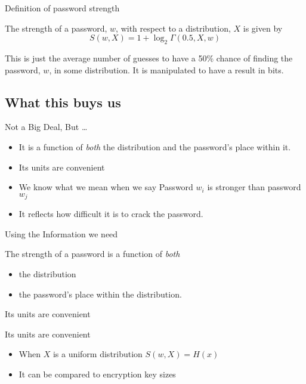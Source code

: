 \documentclass[xcolor={dvipsnames,table}]{beamer}
\newcommand\G{\ensuremath{\Gamma}}
\begin{document}
\begin{frame}{Definition of password strength}
\begin{definition} \label{def:S}
The strength of a password, $w$, with respect to a distribution, $X$ is given by
$$
S(w, X) =  1 + \log_2\G(0.5, X, w)
$$
\end{definition}
This is just the average number of guesses to have a 50\% chance of finding the password, $w$, in some distribution. It is manipulated to have a result in bits.
\end{frame}

\subsection{What this buys us}

\begin{frame}{Not a Big Deal, But \dots}

\begin{itemize}
\item It is a function of \emph{both} the distribution and the password's place within it.

\pause
\item Its units are convenient

\pause
\item We know what we mean when we say Password $w_i$ is stronger than password $w_j$

\pause
\item It reflects how difficult it is to crack the password.
\end{itemize}
\end{frame}

\begin{frame}{Using the Information we need}


The strength of a password is a function of \emph{both}
\begin{itemize}
\item the distribution
\item the password's place within the distribution.
\end{itemize}
\end{frame}



\begin{frame}{Its units are convenient}

Its units are convenient
\begin{itemize}
  \pause \item When $X$ is a uniform distribution $S(w, X) = H(x)$
  \pause \item It can be compared to encryption key sizes
\end{itemize}
\end{frame}
\end{document}
